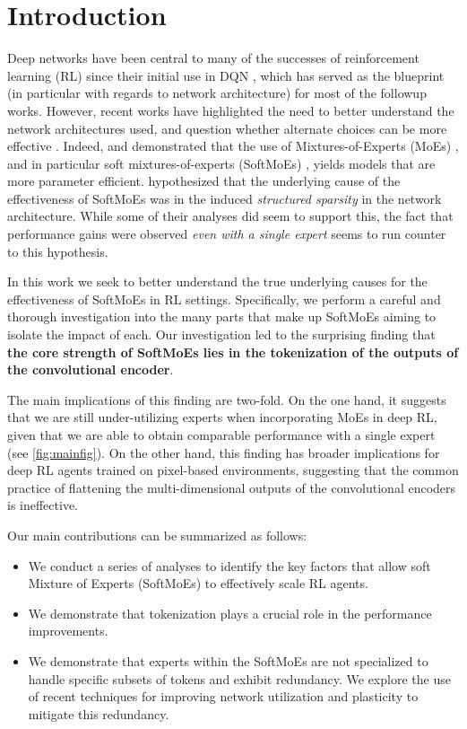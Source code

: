 \documentclass{article} %
\begin{document}
\section{Introduction}
\label{sec:intro}
Deep networks have been central to many of the successes of reinforcement learning (RL) since their initial use in DQN \citep{mnih2015humanlevel}, which has served as the blueprint (in particular with regards to network architecture) for most of the followup works. However, recent works have highlighted the need to better understand the network architectures used, and question whether alternate choices can be more effective \citep{graesser2022state,sokar2022dynamic,sokar2023dormant,ceron2024pruned}. Indeed, \citet{ceron2024mixtures} and \citet{willi2024mixture} demonstrated that the use of Mixtures-of-Experts (MoEs) \citep{shazeer2017outrageously}, and in particular soft mixtures-of-experts (SoftMoEs) \citep{puigcerver2024from}, yields models that are more parameter efficient. \citet{ceron2024mixtures} hypothesized that the underlying cause of the effectiveness of SoftMoEs was in the induced {\em structured sparsity} in the network architecture. While some of their analyses did seem to support this, the fact that performance gains were observed {\em even with a single expert} seems to run counter to this hypothesis.


In this work we seek to better understand the true underlying causes for the effectiveness of SoftMoEs in RL settings. Specifically, we perform a careful and thorough investigation into the many parts that make up SoftMoEs aiming to isolate the impact of each. Our investigation led to the surprising finding that {\bf the core strength of SoftMoEs lies in the tokenization of the outputs of the convolutional encoder}. 

The main implications of this finding are two-fold. On the one hand, it suggests that we are still under-utilizing experts when incorporating MoEs in deep RL, given that we are able to obtain comparable performance with a single expert (see \autoref{fig:mainfig}). On the other hand, this finding has broader implications for deep RL agents trained on pixel-based environments, suggesting that the common practice of flattening the multi-dimensional outputs of the convolutional encoders is ineffective.

Our main contributions can be summarized as follows:
\begin{itemize}
    \item We conduct a series of analyses to identify the key factors that allow soft Mixture of Experts (SoftMoEs) to effectively scale RL agents.
    \item We demonstrate that tokenization plays a crucial role in the performance improvements.
    \item We demonstrate that experts within the SoftMoEs are not specialized to handle specific subsets of tokens and exhibit redundancy. We explore the use of recent techniques for improving network utilization and plasticity to mitigate this redundancy.
\end{itemize}
\end{document}
